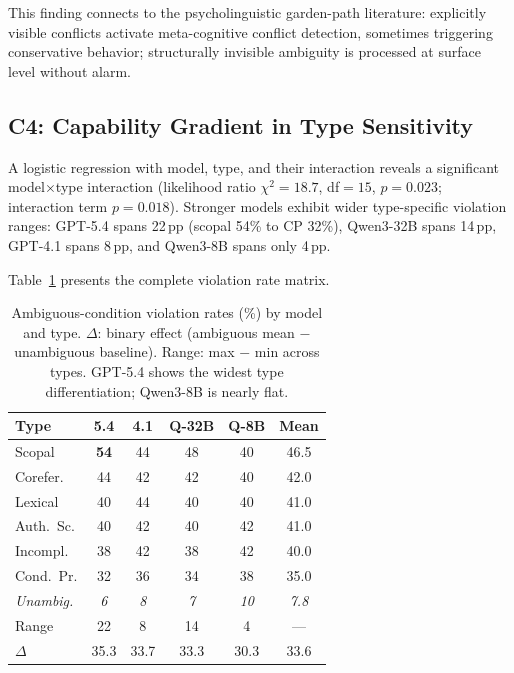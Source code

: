 \documentclass[11pt,a4paper]{article}
\newcommand{\pp}{\,\text{pp}}
\begin{document}
This finding connects to the psycholinguistic garden-path literature: explicitly visible conflicts activate meta-cognitive conflict detection, sometimes triggering conservative behavior; structurally invisible ambiguity is processed at surface level without alarm.

\subsection{C4: Capability Gradient in Type Sensitivity}

A logistic regression with model, type, and their interaction reveals a significant model$\times$type interaction (likelihood ratio $\chi^2 = 18.7$, df$=15$, $p = 0.023$; interaction term $p = 0.018$).
Stronger models exhibit wider type-specific violation ranges: GPT-5.4 spans 22$\pp$ (scopal 54\% to CP 32\%), Qwen3-32B spans 14$\pp$, GPT-4.1 spans 8$\pp$, and Qwen3-8B spans only 4$\pp$.

Table~\ref{tab:full_matrix} presents the complete violation rate matrix.

\begin{table}[t]
\centering
\small
\setlength{\tabcolsep}{3pt}
\begin{tabular}{@{}lcccc|c@{}}
\toprule
\textbf{Type} & \textbf{5.4} & \textbf{4.1} & \textbf{Q-32B} & \textbf{Q-8B} & \textbf{Mean} \\
\midrule
Scopal     & \textbf{54} & 44 & 48 & 40 & 46.5 \\
Corefer.   & 44 & 42 & 42 & 40 & 42.0 \\
Lexical    & 40 & 44 & 40 & 40 & 41.0 \\
Auth.\ Sc. & 40 & 42 & 40 & 42 & 41.0 \\
Incompl.   & 38 & 42 & 38 & 42 & 40.0 \\
Cond.\ Pr. & 32 & 36 & 34 & 38 & 35.0 \\
\midrule
\textit{Unambig.} & \textit{6} & \textit{8} & \textit{7} & \textit{10} & \textit{7.8} \\
\midrule
Range      & 22 & 8 & 14 & 4 & --- \\
$\Delta$   & 35.3 & 33.7 & 33.3 & 30.3 & 33.6 \\
\bottomrule
\end{tabular}
\caption{Ambiguous-condition violation rates (\%) by model and type. $\Delta$: binary effect (ambiguous mean $-$ unambiguous baseline). Range: max $-$ min across types. GPT-5.4 shows the widest type differentiation; Qwen3-8B is nearly flat.}
\label{tab:full_matrix}
\end{table}
\end{document}
